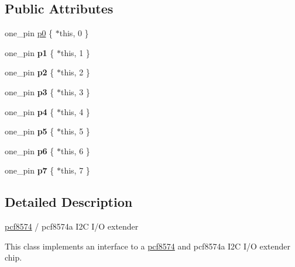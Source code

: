 \subsection*{Public Attributes}
\textbf{ }\par
\begin{DoxyCompactItemize}
\item 
one\+\_\+pin \hyperlink{classhwlib_1_1pcf8574_abfbddc460aa984329c07e7b3913eb4f1}{p0} \{ $\ast$this, 0 \}
\item 
\mbox{\label{classhwlib_1_1pcf8574_a9893a9fad4c3f5caaa13d24c73597392}} 
one\+\_\+pin {\bfseries p1} \{ $\ast$this, 1 \}
\item 
\mbox{\label{classhwlib_1_1pcf8574_a0946e63c5827b121324e2d06ff5b9f56}} 
one\+\_\+pin {\bfseries p2} \{ $\ast$this, 2 \}
\item 
\mbox{\label{classhwlib_1_1pcf8574_a03f36172eb44c4b6db76cefa90df2d96}} 
one\+\_\+pin {\bfseries p3} \{ $\ast$this, 3 \}
\item 
\mbox{\label{classhwlib_1_1pcf8574_abdc74667536ef4d5fb89c7f5c630d6e8}} 
one\+\_\+pin {\bfseries p4} \{ $\ast$this, 4 \}
\item 
\mbox{\label{classhwlib_1_1pcf8574_a74b3ce1094574b52799ffef732b8b528}} 
one\+\_\+pin {\bfseries p5} \{ $\ast$this, 5 \}
\item 
\mbox{\label{classhwlib_1_1pcf8574_a85ffe07f08cad9f90d510c261a6d8e73}} 
one\+\_\+pin {\bfseries p6} \{ $\ast$this, 6 \}
\item 
\mbox{\label{classhwlib_1_1pcf8574_a69d773d1b290988780216b1a8c15c3dc}} 
one\+\_\+pin {\bfseries p7} \{ $\ast$this, 7 \}
\end{DoxyCompactItemize}



\subsection{Detailed Description}
\hyperlink{classhwlib_1_1pcf8574}{pcf8574} / pcf8574a I2C I/O extender

This class implements an interface to a \hyperlink{classhwlib_1_1pcf8574}{pcf8574} and pcf8574a I2C I/O extender chip.



